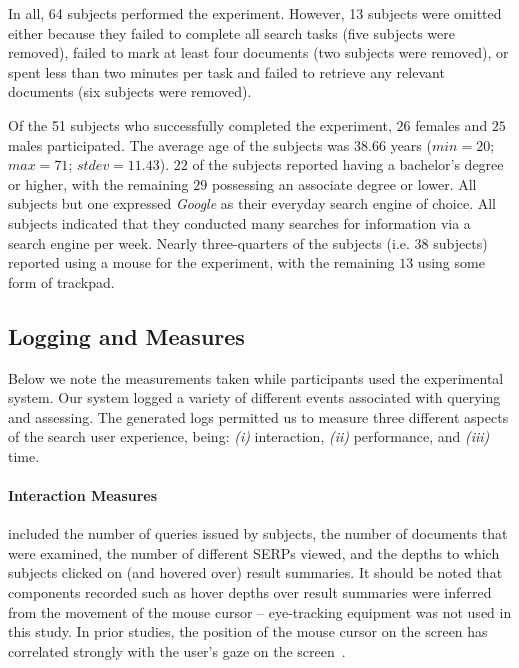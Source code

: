 In all, 64 subjects performed the experiment. However, 13 subjects were omitted either because they failed to complete all search tasks (five subjects were removed), failed to mark at least four documents (two subjects were removed), or spent less than two minutes per task and failed to retrieve any relevant documents (six subjects were removed). 

Of the 51 subjects who successfully completed the experiment, $26$ females and $25$ males participated. The average age of the subjects was $38.66$ years ($min=20$; $max=71$; $stdev=11.43$). $22$ of the subjects reported having a bachelor's degree or higher, with the remaining $29$ possessing an associate degree or lower. All subjects but one expressed \emph{Google} as their everyday search engine of choice. All subjects indicated that they conducted many searches for information via a search engine per week. Nearly three-quarters of the subjects (i.e. 38 subjects) reported using a mouse for the experiment, with the remaining $13$ using some form of trackpad.





\subsection{Logging and Measures}\label{sec:method:behaviours}
Below we note the measurements taken while participants used the experimental system.
Our system logged a variety of different events associated with querying and assessing. The generated logs permitted us to measure three different aspects of the search user experience, being: \emph{(i)} interaction, \emph{(ii)} performance, and \emph{(iii)} time. 

\paragraph{Interaction Measures} included the number of queries issued by subjects, the number of documents that were examined, the number of different SERPs viewed, and the depths to which subjects clicked on (and hovered over) result summaries. It should be noted that components recorded such as hover depths over result summaries were inferred from the movement of the mouse cursor -- eye-tracking equipment was not used in this study. In prior studies, the position of the mouse cursor on the screen has correlated strongly with the user's gaze on the screen~\cite{chen2001mouse_cursor,smucker2014judging_relevance_movements}.
\vspace*{2mm}

